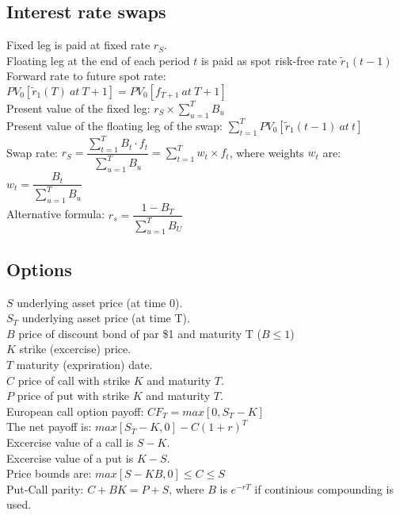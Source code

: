 \subsection*{Interest rate swaps}
Fixed leg is paid at fixed rate $r_S$. \\
Floating leg at the end of each period $t$ is paid as spot risk-free rate $\tilde{r}_1(t-1)$\\
Forward rate to future spot rate:\\
$PV_0[\tilde{r}_1(T)\ at\ T + 1] = PV_0[f_{T+1}\ at\ T + 1]$\\
Present value of the fixed leg:
$r_S\times\sum_{u=1}^TB_u$\\
Present value of the floating leg of the swap: $\sum_{t=1}^TPV_0[\tilde{r}_1(t-1)\ at\ t]$\\
Swap rate:
$r_S = \dfrac{\sum_{t=1}^TB_t\cdot f_t}{\sum_{u=1}^TB_u} = \sum_{t=1}^Tw_t\times f_t$, where weights $w_t$ are:
$w_t=\dfrac{B_t}{\sum_{u=1}^TB_u}$\\
Alternative formula:
$r_s=\dfrac{1-B_T}{\sum_{u=1}^TB_U}$
\subsection*{Options}
$S$ underlying asset price (at time 0).\\
$S_T$ underlying asset price (at time T).\\
$B$ price of discount bond of par \$1 and maturity T ($B \leq 1$)\\
$K$ strike (excercise) price.\\
$T$ maturity (expriration) date.\\
$C$ price of call with strike $K$ and maturity $T$.\\
$P$ price of put with strike $K$ and maturity $T$.\\
European call option payoff:
$CF_T=max[0, S_T - K]$\\
The net payoff is: $max[S_T-K, 0] - C(1+r)^T$\\
Excercise value of a call is $S-K$.\\
Excercise value of a put is $K-S$.\\
Price bounds are: $max[S-KB,0] \leq C \leq S$\\
Put-Call parity: $C + BK = P + S$, where $B$ is $e^{-rT}$ if continious compounding is used.
